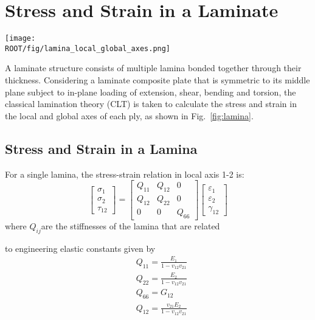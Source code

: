\section{Stress and Strain in a Laminate}
\begin{figure*}[!htb]
	\centering
	\texttt{[image: \\ROOT/fig/lamina\_local\_global\_axes.png]}
	\caption{Local and global axes of an angle lamina.}
  	\label{fig:lamina}
\end{figure*}


A laminate structure consists of multiple lamina bonded together through their thickness.
Considering a laminate composite plate that is symmetric to its middle plane subject to in-plane
loading of extension, shear, bending and torsion, the classical lamination theory (CLT) is taken to
calculate the stress and strain in the local and global axes of each ply, as shown in
Fig.~\ref{fig:lamina}.




\subsection{Stress and Strain in a Lamina}
For a single lamina, the stress-strain relation in local axis 1-2 is:
\begin{equation}
    \begin{bmatrix}
        \sigma _1\\
        \sigma _2\\
        \tau_{12}
    \end{bmatrix}
    =
    \begin{bmatrix}
        Q_{11} & Q_{12} & 0\\
        Q_{12} & Q_{22} & 0\\
        0      &  0     & Q_{66}
    \end{bmatrix}
    \begin{bmatrix}
        \varepsilon_1\\
        \varepsilon_2\\\gamma_{12}
    \end{bmatrix}
\end{equation}
where $Q_{ij} $are the stiffnesses of the lamina that are related

to engineering elastic constants given by
\begin{equation}
    \begin{split}
    &Q_{11}=\frac{E_1}{1-v_{12}v_{21}}\\
    &Q_{22}=\frac{E_2}{1-v_{12}v_{21}}\\
    &Q_{66}=G_{12}\\
    &Q_{12}=\frac{v_{21}E_2}{1-v_{12}v_{21}}\\
    \end{split}
\end{equation}

